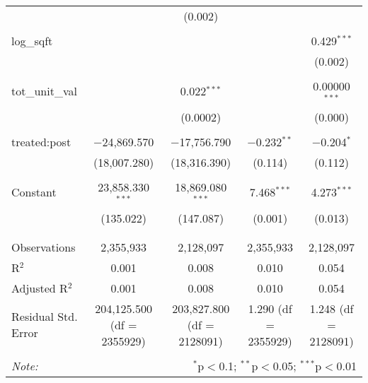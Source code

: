 \begin{table}[H]
{\begin{tabular}{@{\extracolsep{5pt}}lcccc}
   &  & (0.002) &  &  \\  

   & & & & \\  

  log\_sqft &  &  &  & 0.429$^{***}$ \\  

   &  &  &  & (0.002) \\  

   & & & & \\  

  tot\_unit\_val &  & 0.022$^{***}$ &  & 0.00000$^{***}$ \\  

   &  & (0.0002) &  & (0.000) \\  

   & & & & \\  

  treated:post & $-$24,869.570 & $-$17,756.790 & $-$0.232$^{**}$ & $-$0.204$^{*}$ \\  

   & (18,007.280) & (18,316.390) & (0.114) & (0.112) \\  

   & & & & \\  

  Constant & 23,858.330$^{***}$ & 18,869.080$^{***}$ & 7.468$^{***}$ & 4.273$^{***}$ \\  

   & (135.022) & (147.087) & (0.001) & (0.013) \\  

   & & & & \\  

 \hline \\[-1.8ex]  

 Observations & 2,355,933 & 2,128,097 & 2,355,933 & 2,128,097 \\  

 R$^{2}$ & 0.001 & 0.008 & 0.010 & 0.054 \\  

 Adjusted R$^{2}$ & 0.001 & 0.008 & 0.010 & 0.054 \\  

 Residual Std. Error & 204,125.500 (df = 2355929) & 203,827.800 (df = 2128091) & 1.290 (df = 2355929) & 1.248 (df = 2128091) \\  

 \hline  

 \hline \\[-1.8ex]  

 \textit{Note:}  & \multicolumn{4}{r}{$^{*}$p$<$0.1; $^{**}$p$<$0.05; $^{***}$p$<$0.01} \\  

 \end{tabular}}  

 \end{table}  

